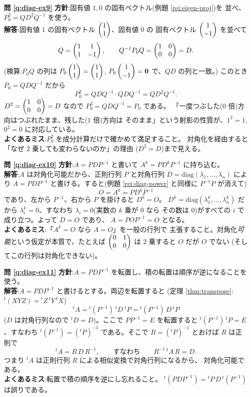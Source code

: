 \bigskip
\noindent\textbf{問 \ref{q:diag-ex9}}\quad
\textbf{方針}:固有値 $1, 0$ の固有ベクトル(例題 \ref{rei:eigen-proj})を
並べ、$P_0^2 = QD^2Q^{-1}$ を使う。\\
\textbf{解答}:固有値 $1$ の固有ベクトル $\begin{pmatrix}1 \\ 1\end{pmatrix}$、固有値 $0$ の
固有ベクトル $\begin{pmatrix}1 \\ -1\end{pmatrix}$ を並べて
\[
Q = \begin{pmatrix}1 & 1 \\ 1 & -1\end{pmatrix}, \qquad
Q^{-1}P_0Q = \begin{pmatrix}1 & 0 \\ 0 & 0\end{pmatrix} = D.
\]
(検算:$P_0Q$ の列は $P_0\begin{pmatrix}1 \\ 1\end{pmatrix} = \begin{pmatrix}1 \\ 1\end{pmatrix}$,
$P_0\begin{pmatrix}1 \\ -1\end{pmatrix} = \bm{0}$ で、$QD$ の列と一致。)
このとき $P_0 = QDQ^{-1}$ だから
\[
P_0^2 = QDQ^{-1} \cdot QDQ^{-1} = QD^2Q^{-1}.
\]
$D^2 = \begin{pmatrix}1 & 0 \\ 0 & 0\end{pmatrix} = D$ なので $P_0^2 = QDQ^{-1} = P_0$ である。
「一度つぶした($0$ 倍)方向はつぶれたまま、残した($1$ 倍)方向は
そのまま」という射影の性質が、$1^2 = 1$, $0^2 = 0$ に対応している。\\
\textbf{よくあるミス}:$P_0^2$ を成分計算だけで確かめて満足すること。
対角化を経由すると「なぜ $2$ 乗しても変わらないのか」の理由
($D^2 = D$)まで見える。

\bigskip
\noindent\textbf{問 \ref{q:diag-ex10}}\quad
\textbf{方針}:$A = PDP^{-1}$ と書いて $A^k = PD^kP^{-1}$ に持ち込む。\\
\textbf{解答}:$A$ は対角化可能だから、正則行列 $P$ と対角行列
$D = \mathrm{diag}(\lambda_1, \dots, \lambda_n)$ により
$A = PDP^{-1}$ と書ける。すると(例題 \ref{rei:diag-power} と同様に
$P^{-1}P$ が消えて)
\[
O = A^k = PD^kP^{-1}
\]
であり、左から $P^{-1}$、右から $P$ を掛けると $D^k = O$。
$D^k = \mathrm{diag}(\lambda_1^k, \dots, \lambda_n^k)$ だから
$\lambda_i^k = 0$、すなわち $\lambda_i = 0$(実数の $k$ 乗が $0$ なら
その数は $0$)がすべての $i$ で成り立つ。よって $D = O$ であり、
$A = POP^{-1} = O$ となる。\\
\textbf{よくあるミス}:「$A^k = O$ なら $A = O$」を一般の行列で
主張すること。対角化\emph{可能}という仮定が本質で、たとえば
$\begin{pmatrix}0 & 1 \\ 0 & 0\end{pmatrix}$ は $2$ 乗すると $O$ だが $O$ でない
(そしてこの行列は対角化できない)。

\bigskip
\noindent\textbf{問 \ref{q:diag-ex11}}\quad
\textbf{方針}:$A = PDP^{-1}$ を転置し、積の転置は順序が逆になることを
使う。\\
\textbf{解答}:$A = PDP^{-1}$ と書けるとする。両辺を転置すると
(定理 \ref{thm:transpose}:$ {}^t(XYZ) = {}^tZ\,{}^tY\,{}^tX$)
\[
{}^t\!A = {}^t(P^{-1})\ {}^tD\ {}^tP = {}^t(P^{-1})\,D\,{}^tP
\]
($D$ は対角行列なので ${}^tD = D$)。ここで
$PP^{-1} = E$ を転置すると ${}^t(P^{-1})\,{}^tP = E$、すなわち
${}^t(P^{-1}) = ({}^tP)^{-1}$ である。そこで $R = ({}^tP)^{-1}$ とおけば
$R$ は正則で
\[
{}^t\!A = R\,D\,R^{-1}, \qquad \text{すなわち} \qquad
R^{-1}\,{}^t\!A\,R = D.
\]
つまり ${}^t\!A$ は正則行列 $R$ による相似変換で対角行列になるから、
対角化可能である。\\
\textbf{よくあるミス}:転置で積の順序を逆にし忘れること。
${}^t(PDP^{-1}) = {}^tP\,D\,{}^t(P^{-1})$ は誤りである。

